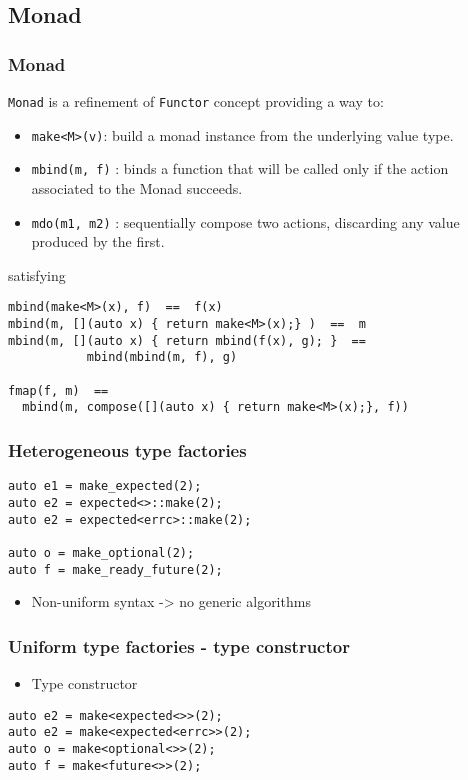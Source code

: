 \documentclass[xcolor=dvipsnames]{beamer}
\newcommand{\cpp}[1]{\lstinline{#1}}
\begin{document}
\subsection{Monad}
\begin{frame}[fragile]
\frametitle{Monad}

\cpp{Monad} is a refinement of \cpp{Functor} concept  providing a way to:

\begin{itemize}
  \item \cpp{make<M>(v)}: build a monad instance from the underlying value type.
  \item \cpp{mbind(m, f)} : binds a function that will be called only if the action associated to the Monad succeeds.
  \item \cpp{mdo(m1, m2)} : sequentially compose two actions, discarding any value produced by the first.
\end{itemize}

satisfying

\begin{lstlisting}
mbind(make<M>(x), f)  ==  f(x)
mbind(m, [](auto x) { return make<M>(x);} )  ==  m
mbind(m, [](auto x) { return mbind(f(x), g); }  ==  
           mbind(mbind(m, f), g)

fmap(f, m)  ==  
  mbind(m, compose([](auto x) { return make<M>(x);}, f))
\end{lstlisting}
\end{frame}
\begin{frame}[fragile]
\frametitle{Heterogeneous type factories}

\begin{lstlisting}
auto e1 = make_expected(2); 
auto e2 = expected<>::make(2); 
auto e2 = expected<errc>::make(2);

auto o = make_optional(2); 
auto f = make_ready_future(2); 
\end{lstlisting}

\begin{itemize}
  \item Non-uniform syntax -> no generic algorithms 
\end{itemize}

\end{frame}
\begin{frame}[fragile]
\frametitle{Uniform type factories - type constructor}

\begin{itemize}
  \item Type constructor 
\end{itemize}

\begin{lstlisting}
auto e2 = make<expected<>>(2); 
auto e2 = make<expected<errc>>(2);
auto o = make<optional<>>(2); 
auto f = make<future<>>(2); 
\end{lstlisting}
\end{frame}
\end{document}
